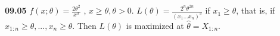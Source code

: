 
{\bf 09.05}
$f(x;\theta)=\frac{2\theta^2}{x^3}$ , $x\geq\theta,\theta>0$. $L(\theta)=\frac{2^n\theta^{2n}}{(x_1...x_n)^3}$ if $x_1\geq\theta$, that is, if $x_{1:n}\geq\theta,
...,x_n\geq\theta$. Then $L(\theta)$ is maximized at $\hat{\theta}=X_{1:n}$. \\

